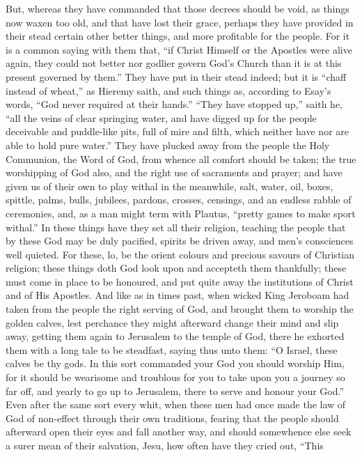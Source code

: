 But, whereas they have commanded that those decrees should be void,
as things now waxen too old, and that have lost their grace, perhaps
they have provided in their stead certain other better things, and more
profitable for the people. For it is a common saying with them
that, “if Christ Himself or the Apostles were alive again, they
could not better nor godlier govern God’s Church than it is at
this present governed by them.” They have put in their stead
indeed; but it is “chaff instead of wheat,” as Hieremy saith,
and such things as, according to Esay’s words, “God never
required at their hands.” “They have stopped up,”
saith he, “all the veins of clear springing water, and have digged
up for the people deceivable and puddle-like pits, full of mire and
filth, which neither have nor are able to hold pure water.”
They have plucked away from the people the Holy Communion, the Word
of God, from whence all comfort should be taken; the true worshipping
of God also, and the right use of sacraments and prayer; and have given
us of their own to play withal in the meanwhile, salt, water, oil, boxes,
spittle, palms, bulls, jubilees, pardons, crosses, censings, and an
endless rabble of ceremonies, and, as a man might term with Plautus,
“pretty games to make sport withal.” In these things
have they set all their religion, teaching the people that by these
God may be duly pacified, spirits be driven away, and men’s consciences
well quieted. For these, lo, be the orient colours and precious
savours of Christian religion; these things doth God look upon and accepteth
them thankfully; these must come in place to be honoured, and put quite
away the institutions of Christ and of His Apostles. And like
as in times past, when wicked King Jeroboam had taken from the people
the right serving of God, and brought them to worship the golden calves,
lest perchance they might afterward change their mind and slip away,
getting them again to
Jerusalem to the temple of God, there he exhorted them with a long tale
to be steadfast, saying thus unto them: “O Israel, these calves
be thy gods. In this sort commanded your God you should worship
Him, for it should be wearisome and troublous for you to take upon you
a journey so far off, and yearly to go up to Jerusalem, there to serve
and honour your God.” Even after the same sort every whit,
when these men had once made the law of God of non-effect through their
own traditions, fearing that the people should afterward open their
eyes and fall another way, and should somewhence else seek a surer mean
of their salvation, Jesu, how often have they cried out, “This
